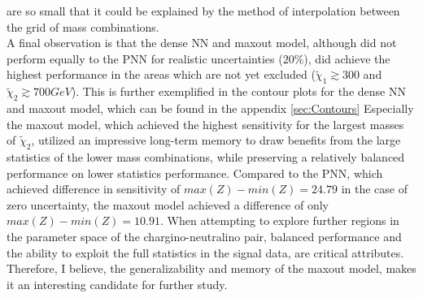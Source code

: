 are so small that it could be explained by the method of interpolation between the grid of mass combinations.
\\
A final observation is that the dense \ac{NN} and maxout model, although did not perform equally to the \ac{PNN} for realistic uncertainties ($20\%$), did achieve the highest performance in 
the areas which are not yet excluded ($\tilde{\chi}_1\gtrsim300$ and $\tilde{\chi}_2\gtrsim700GeV$). This is further exemplified in the contour plots for the dense \ac{NN} and maxout model, which 
can be found in the appendix \ref{sec:Contours} Especially the maxout model, which achieved the highest sensitivity for the largest 
masses of $\tilde{\chi}_2$, utilized an impressive long-term memory to draw benefits from the large statistics of the lower mass combinations, while preserving a relatively balanced performance on 
lower statistics performance. Compared to the \ac{PNN}, which achieved difference in sensitivity of $max(Z)-min(Z) = 24.79$ in the case of zero uncertainty, the maxout model achieved a difference 
of only $max(Z)-min(Z) = 10.91$. When attempting to explore further regions in the parameter space of the chargino-neutralino pair, balanced performance and the ability to exploit the full statistics in the 
signal data, are critical attributes. Therefore, I believe, the generalizability and memory of the maxout model, makes it an interesting candidate for further study.

